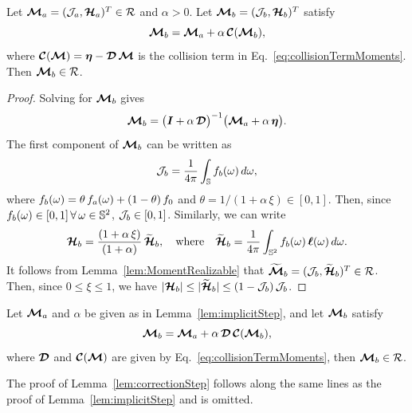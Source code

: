 \begin{lemma}
  Let $\boldsymbol{\mathcal{M}}_{a}=(\mathcal{J}_{a},\boldsymbol{\mathcal{H}}_{a})^{T}\in\mathcal{R}$ and $\alpha>0$.  
  Let $\boldsymbol{\mathcal{M}}_{b}=(\mathcal{J}_{b},\boldsymbol{\mathcal{H}}_{b})^{T}$ satisfy
  \begin{equation*}
    \boldsymbol{\mathcal{M}}_{b}=\boldsymbol{\mathcal{M}}_{a}+\alpha\,\boldsymbol{\mathcal{C}}(\boldsymbol{\mathcal{M}}_{b}), 
  \end{equation*}
  where $\boldsymbol{\mathcal{C}}(\boldsymbol{\mathcal{M}})=\boldsymbol{\eta}-\boldsymbol{\mathcal{D}}\,\boldsymbol{\mathcal{M}}$ is the collision term in Eq.~\eqref{eq:collisionTermMoments}.  
  Then $\boldsymbol{\mathcal{M}}_{b}\in\mathcal{R}$.  
  \label{lem:implicitStep}
\end{lemma}
\begin{proof}
  Solving for $\boldsymbol{\mathcal{M}}_{b}$ gives
  \begin{equation*}
    \boldsymbol{\mathcal{M}}_{b} = \big(\boldsymbol{I}+\alpha\,\boldsymbol{\mathcal{D}}\big)^{-1}\big(\boldsymbol{\mathcal{M}}_{a}+\alpha\,\boldsymbol{\eta}\big).  
  \end{equation*}
  The first component of $\boldsymbol{\mathcal{M}}_{b}$ can be written as
  \begin{equation*}
    \mathcal{J}_{b}=\frac{1}{4\pi}\int_{\mathbb{S}}f_{b}(\omega)\,d\omega,
  \end{equation*}
  where $f_{b}(\omega)=\theta\,f_{a}(\omega)+(1-\theta)\,f_{0}$ and $\theta=1/(1+\alpha\,\xi)\in[0,1]$.  
  Then, since $f_{b}(\omega)\in[0,1]\,\forall\,\omega\in\mathbb{S}^{2}$, $\mathcal{J}_{b}\in[0,1]$.  
  Similarly, we can write
  \begin{equation*}
    \boldsymbol{\mathcal{H}}_{b}=\frac{(1+\alpha\,\xi)}{(1+\alpha)}\,\widetilde{\boldsymbol{\mathcal{H}}}_{b},
    \quad\text{where}\quad
    \widetilde{\boldsymbol{\mathcal{H}}}_{b}=\frac{1}{4\pi}\int_{\mathbb{S}^{2}}f_{b}(\omega)\,\boldsymbol{\ell}(\omega)\,d\omega.  
  \end{equation*}
  It follows from Lemma~\ref{lem:MomentRealizable} that $\widetilde{\boldsymbol{\boldsymbol{\mathcal{M}}}}_{b}=(\mathcal{J}_{b},\widetilde{\boldsymbol{\mathcal{H}}}_{b})^{T}\in\mathcal{R}$.  
  Then, since $0\le\xi\le1$, we have $|\boldsymbol{\mathcal{H}}_{b}|\le|\widetilde{\boldsymbol{\mathcal{H}}}_{b}|\le(1-\mathcal{J}_{b})\,\mathcal{J}_{b}$.  
\end{proof}

\begin{lemma}
  Let $\boldsymbol{\mathcal{M}}_{a}$ and $\alpha$ be given as in Lemma~\ref{lem:implicitStep}, and let $\boldsymbol{\mathcal{M}}_{b}$ satisfy
  \begin{equation*}
    \boldsymbol{\mathcal{M}}_{b}=\boldsymbol{\mathcal{M}}_{a}+\alpha\,\boldsymbol{\mathcal{D}}\,\boldsymbol{\mathcal{C}}(\boldsymbol{\mathcal{M}}_{b}),    
  \end{equation*}
  where $\boldsymbol{\mathcal{D}}$ and $\boldsymbol{\mathcal{C}}(\boldsymbol{\mathcal{M}})$ are given by Eq.~\eqref{eq:collisionTermMoments},  then $\boldsymbol{\mathcal{M}}_{b}\in\mathcal{R}$.  
  \label{lem:correctionStep}
\end{lemma}
The proof of Lemma~\ref{lem:correctionStep} follows along the same lines as the proof of Lemma~\ref{lem:implicitStep} and is omitted.  
